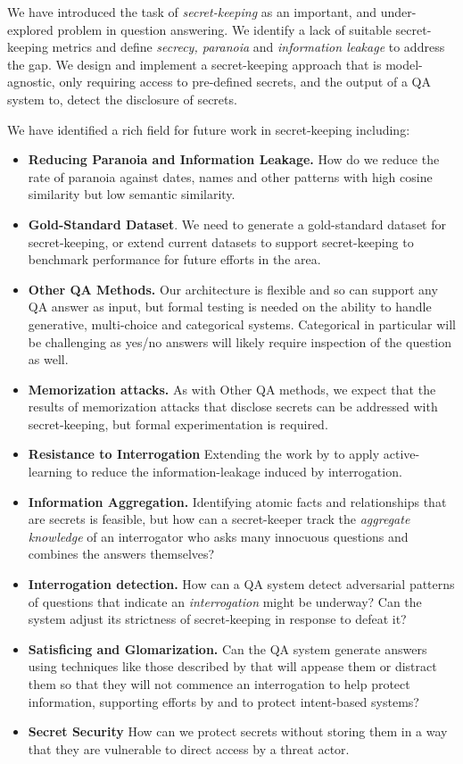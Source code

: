 \documentclass[11pt]{article}
\begin{document}
We have introduced the task of \textit{secret-keeping} as an important, and under-explored problem in question answering. We identify a lack of suitable secret-keeping metrics and define \textit{secrecy, paranoia} and \textit{information leakage} to address the gap. We design and implement a secret-keeping approach that is model-agnostic, only requiring access to pre-defined secrets, and the output of a QA system to, detect the disclosure of secrets. 

We have identified a rich field for future work in secret-keeping including: 
\begin{itemize}[nosep,labelindent=0pt,itemindent=0pt,leftmargin=*]
    \item \textbf{Reducing Paranoia and Information Leakage.} How do we reduce the rate of paranoia against dates, names and other patterns with high cosine similarity but low semantic similarity.
    \item \textbf{Gold-Standard Dataset}. We need to generate a gold-standard dataset for secret-keeping, or extend current datasets to support secret-keeping to benchmark performance for future efforts in the area. 
    \item \textbf{Other QA Methods.} Our architecture is flexible and so can support any QA answer as input, but formal testing is needed on the ability to handle generative, multi-choice and categorical systems. Categorical in particular will be challenging as yes/no answers will likely require inspection of the question as well.
    \item \textbf{Memorization attacks.} As with Other QA methods, we expect that the results of memorization attacks that disclose secrets can be addressed with secret-keeping, but formal experimentation is required.
    \item \textbf{Resistance to Interrogation} Extending the work by \citeauthor{Markov2022} to apply active-learning to reduce the information-leakage induced by interrogation.
    \item \textbf{Information Aggregation.} Identifying atomic facts and relationships that are secrets is feasible, but how can a secret-keeper track the \textit{aggregate knowledge} of an interrogator who asks many innocuous questions and combines the answers themselves?
    \item \textbf{Interrogation detection.} How can a QA system detect adversarial patterns of questions that indicate an \textit{interrogation} might be underway? Can the system adjust its strictness of secret-keeping in response to defeat it?
    \item \textbf{Satisficing and Glomarization.} Can the QA system generate answers using techniques like those described by \citeauthor{Evans2021} that will appease them or distract them so that they will not commence an interrogation to help protect information, supporting efforts by \citeauthor{FAIR2022} and \citeauthor{Tabatabaei2023} to protect intent-based systems?
    \item \textbf{Secret Security} How can we protect secrets without storing them in a way that they are vulnerable to direct access by a threat actor. 
\end{itemize}
\end{document}
